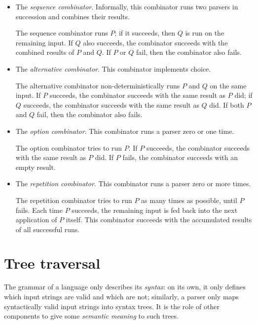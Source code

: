 \documentclass[UdineBachThesis,american,11pt]{PhdThesis}
\begin{document}
  \begin{itemize}
    \item The \emph{sequence combinator}. Informally, this combinator runs two
    parsers in succession and combines their results.

    The sequence combinator runs $P$; if it succeeds, then $Q$ is run on the
    remaining input. If $Q$ also succeeds, the combinator succeeds with the
    combined results of $P$ and $Q$\@. If $P$ or $Q$ fail, then the combinator
    also fails.

    \item The \emph{alternative combinator}. This combinator implements choice.

    The alternative combinator non-deterministically runs $P$ and $Q$ on the
    same input. If $P$ succeeds, the combinator succeeds with the same result as
    $P$ did; if $Q$ succeeds, the combinator succeeds with the same result as
    $Q$ did. If both $P$ and $Q$ fail, then the combinator also fails.

    \item The \emph{option combinator}. This combinator runs a parser zero or
    one time.

    The option combinator tries to run $P$\@. If $P$ succeeds, the combinator
    succeeds with the same result as $P$ did. If $P$ fails, the combinator
    succeeds with an empty result.

    \item The \emph{repetition combinator}. This combinator runs a parser zero
    or more times.

    The repetition combinator tries to run $P$ as many times as possible, until
    $P$ fails. Each time $P$ succeeds, the remaining input is fed back into the
    next application of $P$ itself. This combinator succeeds with the
    accumulated results of all successful runs.
  \end{itemize}

  \newpage

  \section{Tree traversal}

  The grammar of a language only describes its \emph{syntax}: on its own, it
  only defines which input strings are valid and which are not; similarly, a
  parser only maps syntactically valid input strings into syntax trees. It is
  the role of other components to give some \emph{semantic meaning} to such
  trees.
\end{document}
